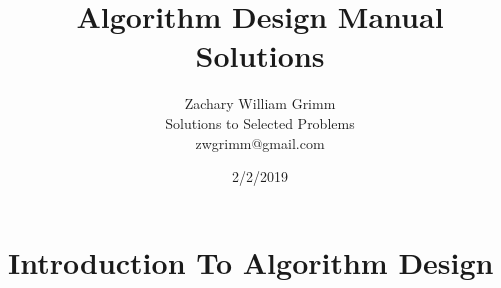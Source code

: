 \documentclass[12pt,fleqn,leqno,letterpaper]{article}
\title{Algorithm Design Manual Solutions}
\author{Zachary William Grimm\\
  \small{Solutions to Selected Problems}\\
  \small{zwgrimm@gmail.com}
}
\date{2/2/2019}
\begin{document}
\maketitle



\section{Introduction To Algorithm Design}





% 
\end{document}
